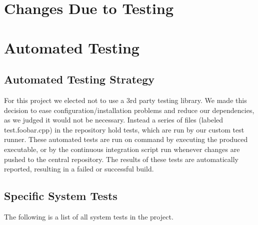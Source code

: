 \documentclass[12pt, titlepage]{article}
\begin{document}
\section{Changes Due to Testing}

\section{Automated Testing}

\subsection{Automated Testing Strategy}
For this project we elected not to use a 3rd party testing library. We made this decision to ease configuration/installation problems and reduce our dependencies, as we judged it would not be necessary. Instead a series of files (labeled test.foobar.cpp) in the repository hold tests, which are run by our custom test runner. These automated tests are run on command by executing the produced executable, or by the continuous integration script run whenever changes are pushed to the central repository. The results of these tests are automatically reported, resulting in a failed or successful build.

\subsection{Specific System Tests}
The following is a list of all system tests in the project.
\end{document}
